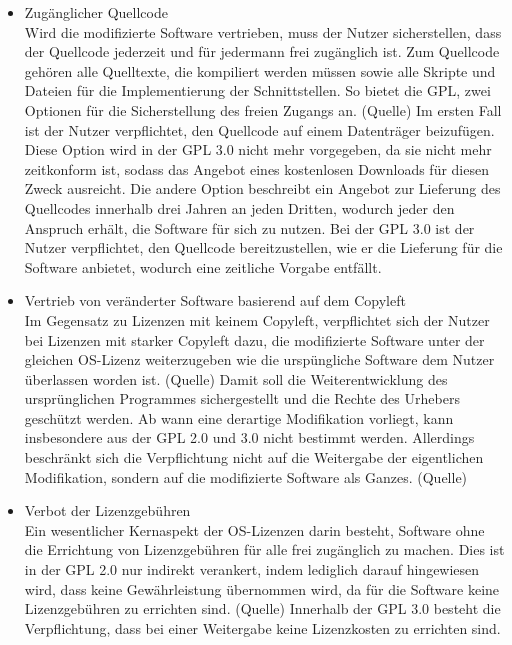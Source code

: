 \begin{itemize}
    \item Zugänglicher Quellcode\\
    Wird die modifizierte Software vertrieben, muss der Nutzer sicherstellen, dass der Quellcode jederzeit und für jedermann frei zugänglich ist. Zum Quellcode gehören alle Quelltexte, die kompiliert werden müssen sowie alle Skripte und Dateien für die Implementierung der Schnittstellen. So bietet die GPL, zwei Optionen für die Sicherstellung des freien Zugangs an. (Quelle) Im ersten Fall ist der Nutzer verpflichtet, den Quellcode auf einem Datenträger beizufügen. Diese Option wird in der GPL 3.0 nicht mehr vorgegeben, da sie nicht mehr zeitkonform ist, sodass das Angebot eines kostenlosen Downloads für diesen Zweck ausreicht. Die andere Option beschreibt ein Angebot zur Lieferung des Quellcodes innerhalb drei Jahren an jeden Dritten, wodurch jeder den Anspruch erhält, die Software für sich zu nutzen. Bei der GPL 3.0 ist der Nutzer verpflichtet, den Quellcode bereitzustellen, wie er die Lieferung für die Software anbietet, wodurch eine zeitliche Vorgabe entfällt.  

    \item Vertrieb von veränderter Software basierend auf dem Copyleft\\
    Im Gegensatz zu Lizenzen mit keinem Copyleft, verpflichtet sich der Nutzer bei Lizenzen mit starker Copyleft dazu, die modifizierte Software unter der gleichen OS-Lizenz weiterzugeben wie die urspüngliche Software dem Nutzer überlassen worden ist. (Quelle) Damit soll die Weiterentwicklung des ursprünglichen Programmes sichergestellt und die Rechte des Urhebers geschützt werden. Ab wann eine derartige Modifikation vorliegt, kann insbesondere aus der GPL 2.0 und 3.0 nicht bestimmt werden. Allerdings beschränkt sich die Verpflichtung nicht auf die Weitergabe der eigentlichen Modifikation, sondern auf die modifizierte Software als Ganzes. (Quelle) 

    \item Verbot der Lizenzgebühren\\
    Ein wesentlicher Kernaspekt der OS-Lizenzen darin besteht, Software ohne die Errichtung von Lizenzgebühren für alle frei zugänglich zu machen. Dies ist in der GPL 2.0 nur indirekt verankert, indem lediglich darauf hingewiesen wird, dass keine Gewährleistung übernommen wird, da für die Software keine Lizenzgebühren zu errichten sind. (Quelle) Innerhalb der GPL 3.0 besteht die Verpflichtung, dass bei einer Weitergabe keine Lizenzkosten zu errichten sind. 


\end{itemize}
